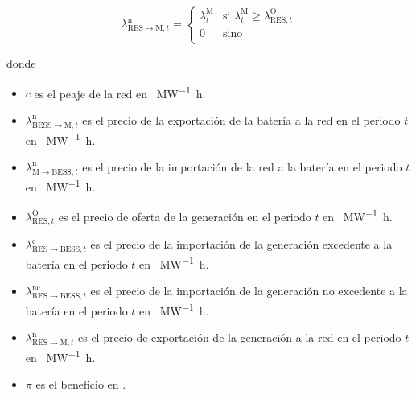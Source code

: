 \begin{subequations}
  \begin{equation}
    \lambda^{\mathrm{n}}_{\mathrm{RES} \rightarrow \mathrm{M}, t} =
    \begin{cases}
      \lambda^{\mathrm{M}}_{t} & \text{si } \lambda^{\mathrm{M}}_{t} \ge \lambda^{\mathrm{O}}_{\mathrm{RES}, t} \\
      0                        & \text{sino}                                                                    \\
    \end{cases}
  \end{equation}

\end{subequations}

donde

\begin{itemize}

  \item \( c \) es el peaje de la red en \si{\text{\euro}\per\mega\watt\hour}.

  \item \( \lambda^{\mathrm{n}}_{\mathrm{BESS} \rightarrow \mathrm{M}, t} \) es el precio de la exportación de la batería a la red en el periodo \( t \) en \si{\text{\euro}\per\mega\watt\hour}.

  \item \( \lambda^{\mathrm{n}}_{\mathrm{M} \rightarrow \mathrm{BESS}, t}\) es el precio de la importación de la red a la batería en el periodo \( t \) en \si{\text{\euro}\per\mega\watt\hour}.

  \item \( \lambda^{\mathrm{O}}_{\mathrm{RES}, t} \) es el precio de oferta de la generación en el periodo \( t \) en \si{\text{\euro}\per\mega\watt\hour}.

  \item \( \lambda^{\mathrm{c}}_{\mathrm{RES} \rightarrow \mathrm{BESS}, t} \) es el precio de la importación de la generación excedente a la batería en el periodo \( t \) en \si{\text{\euro}\per\mega\watt\hour}.

  \item \( \lambda^{\mathrm{nc}}_{\mathrm{RES} \rightarrow \mathrm{BESS}, t} \) es el precio de la importación de la generación no excedente a la batería en el periodo \( t \) en \si{\text{\euro}\per\mega\watt\hour}.

  \item \( \lambda^{\mathrm{n}}_{\mathrm{RES} \rightarrow \mathrm{M}, t} \) es el precio de exportación de la generación a la red en el periodo \( t \) en \si{\text{\euro}\per\mega\watt\hour}.

  \item \( \pi \) es el beneficio en \si{\text{\euro}}.

\end{itemize}

